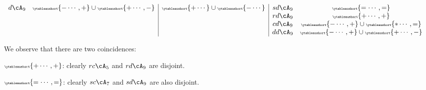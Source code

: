 \documentclass[12pt,a4paper]{amsart}
\numberwithin{equation}{section}
\theoremstyle{remark}
\let\ytb=\ytableaushort
\newcommand{\tytb}[1]{{\tiny\ytb{#1}}}
\begin{document}
{\begin{equation}
\begin{array}{cc|c|cc}
  d\cA_{9}              & \tytb{-\cdots,+}\cup \tytb{+\cdots,-}  &
                                        \tytb{+\cdots} \cup\tytb{-\cdots}    & sd\cA_{9} & \tytb{=\cdots,=}                 \\
                        &                    &                & rd\cA_{9} &\tytb{+\cdots,+}                                   \\
                        &                    &                & cd\cA_{9} &\tytb{-\cdots,+}  \cup \tytb{\ast\cdots,=}                \\
                        &                    &                & dd\cA_{9} &\tytb{-\cdots,+} \cup \tytb{+\cdots,-}                       \\
\end{array}
\end{equation}

We observe that there are two coincidences:
\begin{enumT}
  \item $\tytb{+\cdots,+}$: clearly $rc\cA_{5}$ and $rd\cA_{9}$ are disjoint.
  \item $\tytb{=\cdots,=}$: clearly $sc\cA_{7}$ and $sd\cA_{9}$ are also disjoint.
\end{enumT}


}
\end{document}
